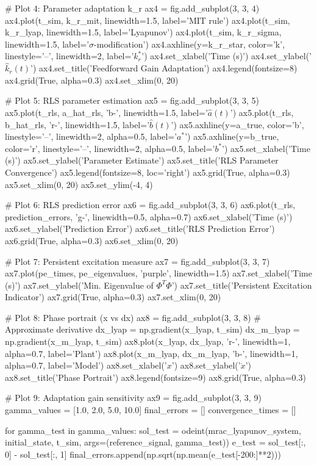 \documentclass[a4paper, 11pt]{article}
\begin{document}
\begin{pycode}
# Plot 4: Parameter adaptation k_r
ax4 = fig.add_subplot(3, 3, 4)
ax4.plot(t_sim, k_r_mit, linewidth=1.5, label='MIT rule')
ax4.plot(t_sim, k_r_lyap, linewidth=1.5, label='Lyapunov')
ax4.plot(t_sim, k_r_sigma, linewidth=1.5, label='$\sigma$-modification')
ax4.axhline(y=k_r_star, color='k', linestyle='--', linewidth=2, label='$k_r^*$')
ax4.set_xlabel('Time (s)')
ax4.set_ylabel('$\hat{k}_r(t)$')
ax4.set_title('Feedforward Gain Adaptation')
ax4.legend(fontsize=8)
ax4.grid(True, alpha=0.3)
ax4.set_xlim(0, 20)

# Plot 5: RLS parameter estimation
ax5 = fig.add_subplot(3, 3, 5)
ax5.plot(t_rls, a_hat_rls, 'b-', linewidth=1.5, label='$\hat{a}(t)$')
ax5.plot(t_rls, b_hat_rls, 'r-', linewidth=1.5, label='$\hat{b}(t)$')
ax5.axhline(y=a_true, color='b', linestyle='--', linewidth=2, alpha=0.5, label='$a^*$')
ax5.axhline(y=b_true, color='r', linestyle='--', linewidth=2, alpha=0.5, label='$b^*$')
ax5.set_xlabel('Time (s)')
ax5.set_ylabel('Parameter Estimate')
ax5.set_title('RLS Parameter Convergence')
ax5.legend(fontsize=8, loc='right')
ax5.grid(True, alpha=0.3)
ax5.set_xlim(0, 20)
ax5.set_ylim(-4, 4)

# Plot 6: RLS prediction error
ax6 = fig.add_subplot(3, 3, 6)
ax6.plot(t_rls, prediction_errors, 'g-', linewidth=0.5, alpha=0.7)
ax6.set_xlabel('Time (s)')
ax6.set_ylabel('Prediction Error')
ax6.set_title('RLS Prediction Error')
ax6.grid(True, alpha=0.3)
ax6.set_xlim(0, 20)

# Plot 7: Persistent excitation measure
ax7 = fig.add_subplot(3, 3, 7)
ax7.plot(pe_times, pe_eigenvalues, 'purple', linewidth=1.5)
ax7.set_xlabel('Time (s)')
ax7.set_ylabel('Min. Eigenvalue of $\Phi^T\Phi$')
ax7.set_title('Persistent Excitation Indicator')
ax7.grid(True, alpha=0.3)
ax7.set_xlim(0, 20)

# Plot 8: Phase portrait (x vs dx)
ax8 = fig.add_subplot(3, 3, 8)
# Approximate derivative
dx_lyap = np.gradient(x_lyap, t_sim)
dx_m_lyap = np.gradient(x_m_lyap, t_sim)
ax8.plot(x_lyap, dx_lyap, 'r-', linewidth=1, alpha=0.7, label='Plant')
ax8.plot(x_m_lyap, dx_m_lyap, 'b-', linewidth=1, alpha=0.7, label='Model')
ax8.set_xlabel('$x$')
ax8.set_ylabel('$\dot{x}$')
ax8.set_title('Phase Portrait')
ax8.legend(fontsize=9)
ax8.grid(True, alpha=0.3)

# Plot 9: Adaptation gain sensitivity
ax9 = fig.add_subplot(3, 3, 9)
gamma_values = [1.0, 2.0, 5.0, 10.0]
final_errors = []
convergence_times = []

for gamma_test in gamma_values:
    sol_test = odeint(mrac_lyapunov_system, initial_state, t_sim, args=(reference_signal, gamma_test))
    e_test = sol_test[:, 0] - sol_test[:, 1]
    final_errors.append(np.sqrt(np.mean(e_test[-200:]**2)))


\end{pycode}
\end{document}
